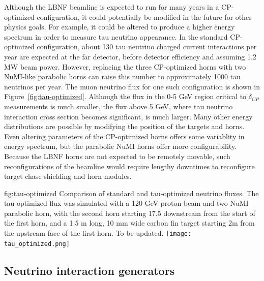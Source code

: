 Although the LBNF beamline is expected to run for many years in a CP-optimized configuration, it could potentially be modified in the future for other physics goals.  For example, it could be altered to produce a higher energy spectrum in order to measure tau neutrino appearance.  In the standard CP-optimized configuration, about 130 tau neutrino charged current interactions per year are expected at the far detector, before detector efficiency and assuming 1.2 MW beam power.  However, replacing the three CP-optimized horns with two NuMI-like parabolic horns can raise this number to approximately 1000 tau neutrinos per year.  The muon neutrino flux for one such configuration is shown in Figure~\ref{fig:tau-optimized}.  Although the flux in the 0-5 GeV region critical to $\delta_{CP}$ measurements is much smaller, the flux above 5 GeV, where tau neutrino interaction cross section becomes significant, is much larger.  Many other energy distributions are possible by modifying the position of the targets and horns.  Even altering parameters of the CP-optimized horns offers some variablity in energy spectrum, but the parabolic NuMI horns offer more configurability.  Because the LBNF horns are not expected to be remotely movable, such reconfigurations of the beamline would require lengthy downtimes to reconfigure target chase shielding and horn modules.   

\begin{dunefigure}{fig:tau-optimized}
{Comparison of standard and tau-optimized neutrino fluxes.  The tau optimized flux was simulated with a 120 GeV proton beam and two NuMI parabolic horn, with the second horn starting 17.5 downstream from the start of the first horn, and a 1.5 m long, 10 mm wide carbon fin target starting 2m from the upstream face of the first horn.  To be updated.  }
\texttt{[image: tau\_optimized.png]}
\end{dunefigure}





\subsection{Neutrino interaction generators} 
\label{sec:tools-mc-gen}


